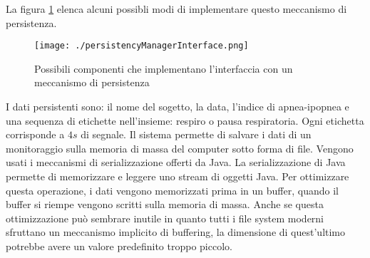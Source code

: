 La figura \ref{pppppp} elenca alcuni possibli modi di implementare questo meccanismo di persistenza.


\begin{figure}
  \centering
  \texttt{[image: ./persistencyManagerInterface.png]}
  \caption{Possibili componenti che implementano l'interfaccia con un meccanismo di persistenza}
  \label{pppppp}
\end{figure}


I dati persistenti sono: il nome del sogetto, la data, l'indice di apnea-ipopnea e una sequenza di etichette nell'insieme: respiro o pausa respiratoria. Ogni etichetta corrisponde a $4s$ di segnale. 
  Il sistema permette di salvare i dati di un monitoraggio sulla memoria di massa del computer sotto forma di file. Vengono usati i meccanismi di serializzazione offerti da Java. La serializzazione di Java permette di memorizzare e leggere uno stream di oggetti Java\cite{javaSerializable}. 
  Per ottimizzare questa operazione, i dati vengono memorizzati prima in un buffer, quando il buffer si riempe vengono scritti sulla memoria di massa. 
  Anche se questa ottimizzazione pu\`o sembrare inutile in quanto tutti i file system moderni sfruttano un meccanismo implicito di buffering, la dimensione di quest'ultimo potrebbe avere un valore predefinito troppo piccolo.




% 
% 
%   






